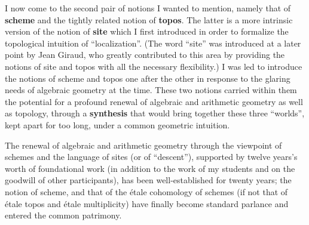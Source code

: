 I now come to the second pair of notions I wanted to mention, namely that of 
\textbf{scheme} and the tightly related notion of \textbf{topos}.
The latter is a more intrinsic version of the notion of \textbf{site} which I first introduced in order
to formalize the topological intuition of ``localization''.
(The word ``site'' was introduced at a later point by Jean Giraud, who greatly contributed to this area by providing the notions of site and topos with all the necessary flexibility.) 
I was led to introduce the notions of scheme and topos one after the other in response to
the glaring needs of algebraic geometry at the time. 
These two notions carried within them the potential for a profound renewal of algebraic and
arithmetic geometry as well as topology, through a \textbf{synthesis} that would bring together these three ``worlds'',
kept apart for too long, under a common geometric intuition.

The renewal of algebraic and arithmetic geometry through the viewpoint of schemes and the
language of sites (or of ``descent''), supported by twelve years's worth of
foundational work (in addition to the work of my students and on the goodwill of other participants), has been well-established for twenty years; 
the notion of scheme, and that of the \'etale cohomology of schemes (if not that of \'etale
topos and \'etale multiplicity) have finally become standard parlance and entered the common patrimony.

